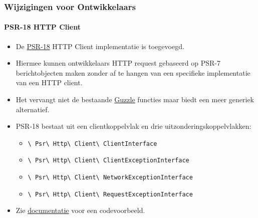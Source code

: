 
\begin{frame}[fragile]
	\frametitle{Wijzigingen voor Ontwikkelaars}
	\framesubtitle{PSR-18 HTTP Client}

	\begin{itemize}
		\item De \href{https://www.php-fig.org/psr/psr-18/}{PSR-18}
			HTTP Client implementatie is toegevoegd.
		\item Hiermee kunnen ontwikkelaars HTTP request gebaseerd op PSR-7 berichtobjecten
			maken zonder af te hangen van een specifieke implementatie van een HTTP client.
		\item Het vervangt niet de bestaande \href{http://guzzlephp.org/}{Guzzle}
			functies maar biedt een meer generiek alternatief.
		\item PSR-18 bestaat uit een clientkoppelvlak en drie uitzonderingskoppelvlakken:

			\begin{itemize}\smaller
				\item \texttt{\textbackslash
					Psr\textbackslash
					Http\textbackslash
					Client\textbackslash
					ClientInterface}
				\item \texttt{\textbackslash
					Psr\textbackslash
					Http\textbackslash
					Client\textbackslash
					ClientExceptionInterface}
				\item \texttt{\textbackslash
					Psr\textbackslash
					Http\textbackslash
					Client\textbackslash
					NetworkExceptionInterface}
				\item \texttt{\textbackslash
					Psr\textbackslash
					Http\textbackslash
					Client\textbackslash
					RequestExceptionInterface}
			\end{itemize}\normalsize

		\item Zie
			\href{https://docs.typo3.org/c/typo3/cms-core/master/en-us/Changelog/10.1/Feature-89216-PSR-18HTTPClientImplementation.html}{documentatie}
			voor een codevoorbeeld.

	\end{itemize}

\end{frame}


